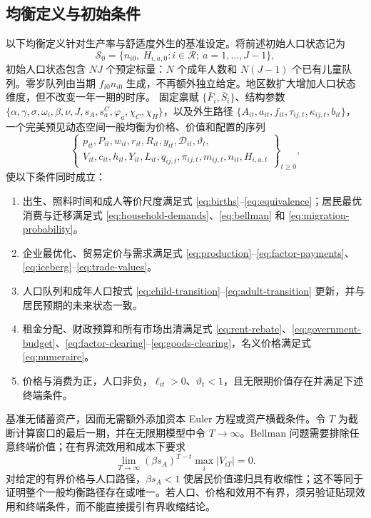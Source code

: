 \documentclass[UTF8,a4paper,zihao=-4,fontset=windows]{ctexart}
\numberwithin{equation}{section}
\begin{document}
\subsection{均衡定义与初始条件}
以下均衡定义针对生产率与舒适度外生的基准设定。将前述初始人口状态记为
\begin{equation}
  \mathcal S_0=\{n_{i0},\ H_{i,a,0}:i\in\mathcal R;\ a=1,\ldots,J-1\},
\end{equation}
初始人口状态包含 $NJ$ 个预定标量：$N$ 个成年人数和 $N(J-1)$ 个已有儿童队列。零岁队列由当期 $f_{i0}n_{i0}$ 生成，不再额外独立给定。地区数扩大增加人口状态维度，但不改变一年一期的时序。
固定禀赋 $\{\bar F_i,\bar S_i\}$、结构参数
$\{\alpha,\gamma,\sigma,\omega_i,\beta,\nu,J,s_A,s^C_a,
\varphi_a,\chi_C,\chi_H\}$，以及外生路径
$\{A_{it},a_{it},f_{it},\tau_{ij,t},\kappa_{ij,t},b_{it}\}$，
一个完美预见动态空间一般均衡为价格、价值和配置的序列
\begin{equation}
  \left\{\begin{gathered}
  p_{it},P_{it},w_{it},r_{it},R_{it},y_{it},\mathcal D_{it},\vartheta_t,\\
  V_{it},c_{it},h_{it},Y_{it},L_{it},
  q_{ij,t},\pi_{ij,t},m_{ij,t},n_{it},H_{i,a,t}
  \end{gathered}\right\}_{t\geq0},
\end{equation}
使以下条件同时成立：
\begin{enumerate}
  \item 出生、照料时间和成人等价尺度满足式 \eqref{eq:births}--\eqref{eq:equivalence}；居民最优消费与迁移满足式 \eqref{eq:household-demands}、\eqref{eq:bellman} 和 \eqref{eq:migration-probability}。
  \item 企业最优化、贸易定价与需求满足式 \eqref{eq:production}--\eqref{eq:factor-payments}、\eqref{eq:iceberg}--\eqref{eq:trade-values}。
  \item 人口队列和成年人口按式 \eqref{eq:child-transition}--\eqref{eq:adult-transition} 更新，并与居民预期的未来状态一致。
  \item 租金分配、财政预算和所有市场出清满足式 \eqref{eq:rent-rebate}、\eqref{eq:government-budget}、\eqref{eq:factor-clearing}--\eqref{eq:goods-clearing}，名义价格满足式 \eqref{eq:numeraire}。
  \item 价格与消费为正，人口非负，$\ell_{it}>0$、$\vartheta_t<1$，且无限期价值存在并满足下述终端条件。
\end{enumerate}
基准无储蓄资产，因而无需额外添加资本 Euler 方程或资产横截条件。令 $T$ 为截断计算窗口的最后一期，并在无限期模型中令 $T\to\infty$。Bellman 问题需要排除任意终端价值；在有界流效用和成本下要求
\begin{equation}
  \lim_{T\to\infty}(\beta s_A)^{T-t}
        \max_i|V_{iT}|=0.
  \label{eq:value-terminal}
\end{equation}
对给定的有界价格与人口路径，$\beta s_A<1$ 使居民价值递归具有收缩性；这不等同于证明整个一般均衡路径存在或唯一。若人口、价格和效用不有界，须另验证贴现效用和终端条件，而不能直接援引有界收缩结论。
\end{document}
